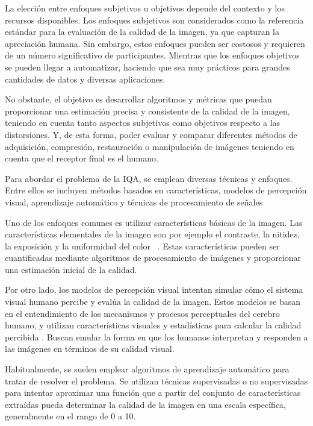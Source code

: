 La elección entre enfoques subjetivos u objetivos depende del contexto y los 
recursos disponibles. Los enfoques subjetivos son considerados como la referencia estándar 
para la evaluación de la calidad de la imagen, ya que capturan la apreciación 
humana. Sin embargo, estos enfoques pueden ser costosos y requieren de un número 
significativo de participantes. 
Mientras que los enfoques objetivos se pueden llegar a automatizar, haciendo que 
sea muy prácticos para grandes cantidades de datos y diversas aplicaciones.
 
No obstante, el objetivo es desarrollar algoritmos y métricas que puedan proporcionar una 
estimación precisa y consistente de la calidad de la imagen, teniendo en cuenta
tanto aspectos subjetivos como objetivos respecto a las distorsiones.
Y, de esta forma, poder evaluar y comparar diferentes métodos de adquisición, compresión, 
restauración o manipulación de imágenes teniendo en cuenta que el receptor 
final es el humano.
 
Para abordar el problema de la IQA, se emplean diversas técnicas y enfoques. 
Entre ellos se incluyen métodos basados en características,
modelos de percepción visual, aprendizaje automático y técnicas de procesamiento de señales
 
Uno de los enfoques comunes es utilizar características básicas de la imagen. 
Las características elementales de la imagen son por ejemplo el contraste, 
la nitidez, la exposición y la uniformidad del color~\cite{Wang2006ModernIQ} . 
Estas características pueden ser cuantificadas mediante algoritmos de procesamiento de 
imágenes y proporcionar una estimación inicial de la calidad. 
 
Por otro lado, los modelos de percepción visual intentan simular cómo el sistema 
visual humano percibe y evalúa la calidad de la imagen. Estos modelos se basan 
en el entendimiento de los mecanismos y procesos perceptuales del cerebro humano, 
y utilizan características visuales y estadísticas para calcular la calidad percibida
\cite{MinkowskiFailure, StructuralSimilarityIndex}.
Buscan emular la forma en que los humanos interpretan y responden 
a las imágenes en términos de su calidad visual\cite{IQAbySaliencyMaps, CascadedIQA}.
 
Habitualmente, se suelen emplear algoritmos de aprendizaje automático para tratar
de resolver el problema. Se utilizan técnicas supervisadas o no supervisadas 
para intentar aproximar una función que a partir del conjunto de características 
extraídas pueda determinar la calidad de la imagen en una escala específica, 
generalmente en el rango de 0 a 10.

